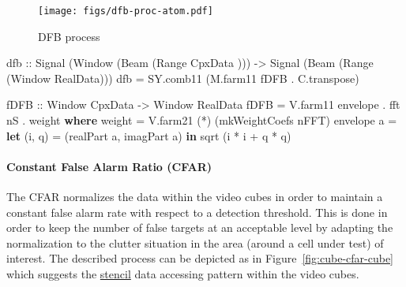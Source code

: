 \documentclass[
  a4paper,
]{article}
\newenvironment{Shaded}{}{}
\newcommand{\DataTypeTok}[1]{\textcolor[rgb]{0.56,0.13,0.00}{#1}}
\newcommand{\FunctionTok}[1]{\textcolor[rgb]{0.02,0.16,0.49}{#1}}
\newcommand{\KeywordTok}[1]{\textcolor[rgb]{0.00,0.44,0.13}{\textbf{#1}}}
\newcommand{\NormalTok}[1]{#1}
\newcommand{\OtherTok}[1]{\textcolor[rgb]{0.00,0.44,0.13}{#1}}
\let\oldparagraph\paragraph
\renewcommand{\paragraph}[1]{\oldparagraph{#1}\mbox{}}
\begin{document}
\begin{figure}
\hypertarget{fig:cube-dfb-proc-atom}{%
\centering
\texttt{[image: figs/dfb-proc-atom.pdf]}
\caption{DFB process}\label{fig:cube-dfb-proc-atom}
}
\end{figure}

\begin{Shaded}
\begin{Highlighting}[numbers=left,,firstnumber=333,]
\OtherTok{dfb ::} \DataTypeTok{Signal}\NormalTok{ (}\DataTypeTok{Window}\NormalTok{ (}\DataTypeTok{Beam}\NormalTok{  (}\DataTypeTok{Range}  \DataTypeTok{CpxData}\NormalTok{ )))}
    \OtherTok{->} \DataTypeTok{Signal}\NormalTok{ (}\DataTypeTok{Beam}\NormalTok{   (}\DataTypeTok{Range}\NormalTok{ (}\DataTypeTok{Window} \DataTypeTok{RealData}\NormalTok{)))}
\NormalTok{dfb }\FunctionTok{=}\NormalTok{ SY.comb11 (M.farm11 fDFB }\FunctionTok{.}\NormalTok{ C.transpose)}

\OtherTok{fDFB ::} \DataTypeTok{Window} \DataTypeTok{CpxData} \OtherTok{->} \DataTypeTok{Window} \DataTypeTok{RealData}
\NormalTok{fDFB }\FunctionTok{=}\NormalTok{ V.farm11 envelope }\FunctionTok{.}\NormalTok{ fft nS }\FunctionTok{.}\NormalTok{ weight}
  \KeywordTok{where}
\NormalTok{    weight     }\FunctionTok{=}\NormalTok{ V.farm21 (}\FunctionTok{*}\NormalTok{) (mkWeightCoefs nFFT)}
\NormalTok{    envelope a }\FunctionTok{=} \KeywordTok{let}\NormalTok{ (i, q) }\FunctionTok{=}\NormalTok{ (realPart a, imagPart a)}
                 \KeywordTok{in} \FunctionTok{sqrt}\NormalTok{ (i }\FunctionTok{*}\NormalTok{ i }\FunctionTok{+}\NormalTok{ q }\FunctionTok{*}\NormalTok{ q)}
\end{Highlighting}
\end{Shaded}

\hypertarget{sec:cube-cfar-atom}{%
\paragraph{Constant False Alarm Ratio (CFAR)}\label{sec:cube-cfar-atom}}

The CFAR normalizes the data within the video cubes in order to maintain
a constant false alarm rate with respect to a detection threshold. This
is done in order to keep the number of false targets at an acceptable
level by adapting the normalization to the clutter situation in the area
(around a cell under test) of interest. The described process can be
depicted as in Figure~\ref{fig:cube-cfar-cube} which suggests the
\href{https://en.wikipedia.org/wiki/Stencil_code}{stencil} data
accessing pattern within the video cubes.
\end{document}
